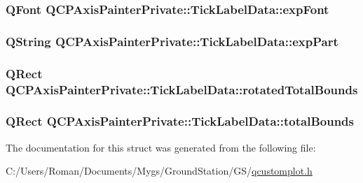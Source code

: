\subsubsection[{exp\+Font}]{\setlength{\rightskip}{0pt plus 5cm}Q\+Font Q\+C\+P\+Axis\+Painter\+Private\+::\+Tick\+Label\+Data\+::exp\+Font}\label{struct_q_c_p_axis_painter_private_1_1_tick_label_data_adc10767ebcb719d6927c012a38b9d933}
\hypertarget{struct_q_c_p_axis_painter_private_1_1_tick_label_data_a09692e4ea092137278b4ac051d5fdf2b}{}
\subsubsection[{exp\+Part}]{\setlength{\rightskip}{0pt plus 5cm}Q\+String Q\+C\+P\+Axis\+Painter\+Private\+::\+Tick\+Label\+Data\+::exp\+Part}\label{struct_q_c_p_axis_painter_private_1_1_tick_label_data_a09692e4ea092137278b4ac051d5fdf2b}
\hypertarget{struct_q_c_p_axis_painter_private_1_1_tick_label_data_aa4d38c5ea47c9184a78ee33ae7f1012e}{}
\subsubsection[{rotated\+Total\+Bounds}]{\setlength{\rightskip}{0pt plus 5cm}Q\+Rect Q\+C\+P\+Axis\+Painter\+Private\+::\+Tick\+Label\+Data\+::rotated\+Total\+Bounds}\label{struct_q_c_p_axis_painter_private_1_1_tick_label_data_aa4d38c5ea47c9184a78ee33ae7f1012e}
\hypertarget{struct_q_c_p_axis_painter_private_1_1_tick_label_data_afbb3163cf4c628914f1b703945419ea5}{}
\subsubsection[{total\+Bounds}]{\setlength{\rightskip}{0pt plus 5cm}Q\+Rect Q\+C\+P\+Axis\+Painter\+Private\+::\+Tick\+Label\+Data\+::total\+Bounds}\label{struct_q_c_p_axis_painter_private_1_1_tick_label_data_afbb3163cf4c628914f1b703945419ea5}


The documentation for this struct was generated from the following file\+:\begin{DoxyCompactItemize}
\item 
C\+:/\+Users/\+Roman/\+Documents/\+Mygs/\+Ground\+Station/\+G\+S/\hyperlink{qcustomplot_8h}{qcustomplot.\+h}\end{DoxyCompactItemize}
